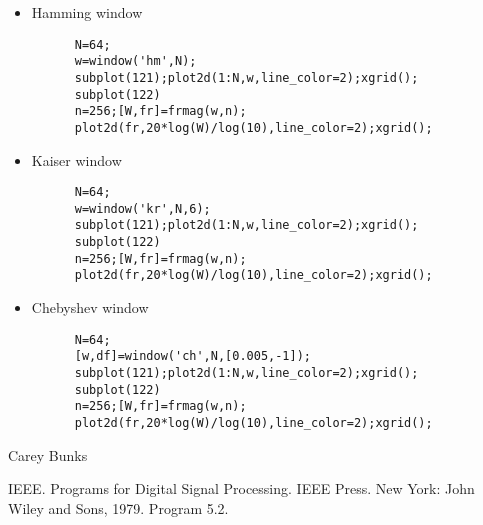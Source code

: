 \begin{examples}
  \begin{itemize}
  \item Hamming window
    \begin{Verbatim}
      N=64;
      w=window('hm',N);
      subplot(121);plot2d(1:N,w,line_color=2);xgrid();
      subplot(122)
      n=256;[W,fr]=frmag(w,n);
      plot2d(fr,20*log(W)/log(10),line_color=2);xgrid();
    \end{Verbatim}
  \item Kaiser window
    \begin{Verbatim}
      N=64;
      w=window('kr',N,6);
      subplot(121);plot2d(1:N,w,line_color=2);xgrid();
      subplot(122)
      n=256;[W,fr]=frmag(w,n);
      plot2d(fr,20*log(W)/log(10),line_color=2);xgrid();
    \end{Verbatim}
  \item Chebyshev window
    \begin{Verbatim}
      N=64;
      [w,df]=window('ch',N,[0.005,-1]);
      subplot(121);plot2d(1:N,w,line_color=2);xgrid();
      subplot(122)
      n=256;[W,fr]=frmag(w,n);
      plot2d(fr,20*log(W)/log(10),line_color=2);xgrid();
    \end{Verbatim}
  \end{itemize}
\end{examples}
\begin{manseealso}
      
\end{manseealso}
\begin{authors}
  Carey Bunks  
\end{authors}
\begin{secbiblio}
  IEEE. Programs for Digital Signal Processing. IEEE Press. New York: John
  Wiley and Sons, 1979. Program 5.2.
\end{secbiblio}
